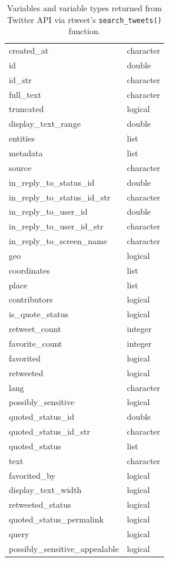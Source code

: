 \documentclass[
  letterpaper,
]{latex/krantz}
\begin{document}
\hypertarget{tbl-ad-rtweet-variables-table}{}
\begin{table}
\caption{\label{tbl-ad-rtweet-variables-table}Variables and variable types returned from Twitter API via rtweet's
\texttt{search\_tweets()} function. }\tabularnewline

\centering
\begin{tabular}{ll}
\toprule
created\_at & character\\
id & double\\
id\_str & character\\
full\_text & character\\
truncated & logical\\
\addlinespace
display\_text\_range & double\\
entities & list\\
metadata & list\\
source & character\\
in\_reply\_to\_status\_id & double\\
\addlinespace
in\_reply\_to\_status\_id\_str & character\\
in\_reply\_to\_user\_id & double\\
in\_reply\_to\_user\_id\_str & character\\
in\_reply\_to\_screen\_name & character\\
geo & logical\\
\addlinespace
coordinates & list\\
place & list\\
contributors & logical\\
is\_quote\_status & logical\\
retweet\_count & integer\\
\addlinespace
favorite\_count & integer\\
favorited & logical\\
retweeted & logical\\
lang & character\\
possibly\_sensitive & logical\\
\addlinespace
quoted\_status\_id & double\\
quoted\_status\_id\_str & character\\
quoted\_status & list\\
text & character\\
favorited\_by & logical\\
\addlinespace
display\_text\_width & logical\\
retweeted\_status & logical\\
quoted\_status\_permalink & logical\\
query & logical\\
possibly\_sensitive\_appealable & logical\\
\bottomrule
\end{tabular}
\end{table}
\end{document}
